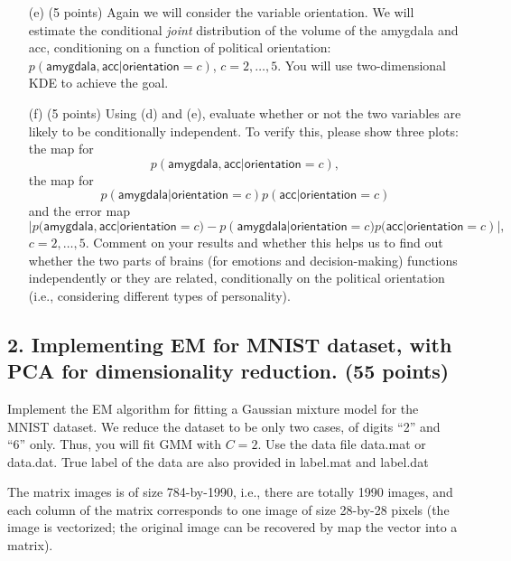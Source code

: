 \documentclass[twoside,12pt]{article}
\begin{document}
\begin{enumerate}
 \item[(e)] (5 points) Again we will consider the variable \textsf{orientation}. We will estimate the conditional {\it joint} distribution of the volume of the \textsf{amygdala} and \textsf{acc}, conditioning on  a function of political \textsf{orientation}: $p(\textsf{amygdala}, \textsf{acc}|\textsf{orientation}=c)$, $c = 2, \ldots, 5$.  You will use two-dimensional KDE to achieve the goal. 
 
 \item[(f)] (5 points) Using (d) and (e), evaluate whether or not the two variables are likely to be conditionally independent. To verify this, please show three plots: the map for \[p( \textsf{amygdala},  \textsf{acc}|\textsf{orientation}=c),\] the map for \[p( \textsf{amygdala}|\textsf{orientation}=c) p(\textsf{acc}|\textsf{orientation}=c)\] and the error map 
 \[|p( \textsf{amygdala},  \textsf{acc}|\textsf{orientation}=c) - p( \textsf{amygdala}|\textsf{orientation}=c) p(\textsf{acc}|\textsf{orientation}=c)|,\] 
 $c = 2, \ldots, 5.$ Comment on your results and whether this helps us to find out whether the two parts of brains (for emotions and decision-making) functions independently or they are related, conditionally on the political orientation (i.e., considering different types of personality). 
 
  
 \end{enumerate}




\subsection*{2. Implementing EM for MNIST dataset, with PCA for dimensionality reduction. (55 points)}

Implement the EM algorithm for fitting a Gaussian mixture model for the MNIST dataset. We reduce the dataset to be only two cases, of digits ``2'' and ``6'' only. Thus, you will fit GMM with $C = 2$. Use the data file \textsf{data.mat} or \textsf{data.dat}. True label of the data are also provided in \textsf{label.mat} and \textsf{label.dat}


The matrix \textsf{images} is of size 784-by-1990, i.e., there are totally 1990 images, and each column of the matrix corresponds to one image of size 28-by-28 pixels (the image is vectorized; the original image can be recovered by map the vector into a matrix). 
\end{document}
